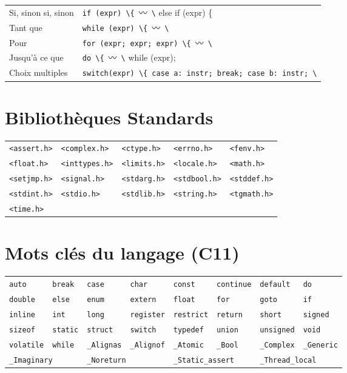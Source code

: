 \documentclass{article}
\newcommand{\any}{$\hzigzag$~}
\newcommand{\cd}{\lstinline}
\begin{document}
\begin{multicols*}{3}
  \begin{tabularx}{\linewidth}{Xl}
  Si, sinon si, sinon & \cd{if (expr) \{}~\any\cd{\} else if (expr) \{}~\any\cd{\} else \{}~\any\cd{\};} \\
  Tant que & \cd{while (expr) \{}~\any\cd{\}} \\
  Pour & \cd{for (expr; expr; expr) \{}~\any\cd{\}} \\
  Jusqu'à ce que & \cd{do \{}~\any\cd{\} while (expr);} \\
  Choix multiples & \cd{switch(expr) \{ case a: instr; break; case b: instr; \}} \\
  \end{tabularx}

\section*{Bibliothèques Standards}
  \begin{tabularx}{\linewidth}{XXXXX}
    \cd{<assert.h>} & \cd{<complex.h>}  & \cd{<ctype.h>}  & \cd{<errno.h>}   & \cd{<fenv.h>} \\
    \cd{<float.h>}  & \cd{<inttypes.h>} & \cd{<limits.h>} & \cd{<locale.h>}  & \cd{<math.h>} \\
    \cd{<setjmp.h>} & \cd{<signal.h>}   & \cd{<stdarg.h>} & \cd{<stdbool.h>} & \cd{<stddef.h>} \\
    \cd{<stdint.h>} & \cd{<stdio.h>}    & \cd{<stdlib.h>} & \cd{<string.h>}  & \cd{<tgmath.h>} \\
    \cd{<time.h>}   &              &            &             & \\
  \end{tabularx}

\section*{Mots clés du langage (C11)}
  \begin{tabularx}{\linewidth}{XXXXXXXX}
    \cd{auto} &
    \cd{break} &
    \cd{case} &
    \cd{char} &
    \cd{const} &
    \cd{continue} &
    \cd{default} &
    \cd{do} \\
    \cd{double} &
    \cd{else} &
    \cd{enum} &
    \cd{extern} &
    \cd{float} &
    \cd{for} &
    \cd{goto} &
    \cd{if} \\
    \cd{inline} &
    \cd{int} &
    \cd{long} &
    \cd{register} &
    \cd{restrict} &
    \cd{return} &
    \cd{short} &
    \cd{signed} \\
    \cd{sizeof} &
    \cd{static} &
    \cd{struct} &
    \cd{switch} &
    \cd{typedef} &
    \cd{union} &
    \cd{unsigned} &
    \cd{void} \\
    \cd{volatile} &
    \cd{while} &
    \cd{_Alignas} &
    \cd{_Alignof} &
    \cd{_Atomic} &
    \cd{_Bool} &
    \cd{_Complex} &
    \cd{_Generic} \\
    \multicolumn{2}{l}{\cd{_Imaginary}} &
    \multicolumn{2}{l}{\cd{_Noreturn}} &
    \multicolumn{2}{l}{\cd{_Static_assert}} &
    \multicolumn{2}{l}{\cd{_Thread_local}}
  \end{tabularx}

\end{multicols*}
\end{document}
